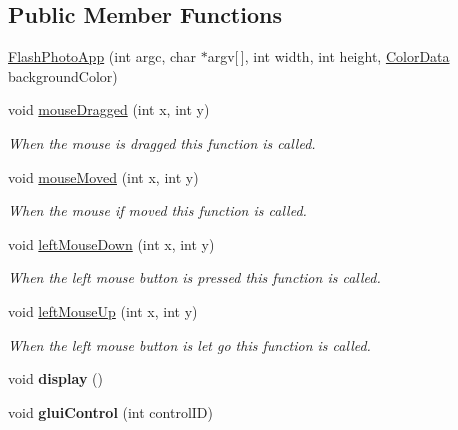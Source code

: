 \subsection*{Public Member Functions}
\begin{DoxyCompactItemize}
\item 
\hyperlink{classFlashPhotoApp_a944931218613603cfb6bda6113971382}{Flash\-Photo\-App} (int argc, char $\ast$argv\mbox{[}$\,$\mbox{]}, int width, int height, \hyperlink{classColorData}{Color\-Data} background\-Color)
\item 
\hypertarget{classFlashPhotoApp_a29505b498fac898e099cfd1b8590c91a}{void \hyperlink{classFlashPhotoApp_a29505b498fac898e099cfd1b8590c91a}{mouse\-Dragged} (int x, int y)}\label{classFlashPhotoApp_a29505b498fac898e099cfd1b8590c91a}

\begin{DoxyCompactList}\small\item\em When the mouse is dragged this function is called. \end{DoxyCompactList}\item 
\hypertarget{classFlashPhotoApp_acf5a4cc5b76bb676d337758543bfdcc4}{void \hyperlink{classFlashPhotoApp_acf5a4cc5b76bb676d337758543bfdcc4}{mouse\-Moved} (int x, int y)}\label{classFlashPhotoApp_acf5a4cc5b76bb676d337758543bfdcc4}

\begin{DoxyCompactList}\small\item\em When the mouse if moved this function is called. \end{DoxyCompactList}\item 
\hypertarget{classFlashPhotoApp_a2c348ddcc15b6a21972bc6aac98c5442}{void \hyperlink{classFlashPhotoApp_a2c348ddcc15b6a21972bc6aac98c5442}{left\-Mouse\-Down} (int x, int y)}\label{classFlashPhotoApp_a2c348ddcc15b6a21972bc6aac98c5442}

\begin{DoxyCompactList}\small\item\em When the left mouse button is pressed this function is called. \end{DoxyCompactList}\item 
\hypertarget{classFlashPhotoApp_ae3a2f37b7c3657dcb5c16402c6d25519}{void \hyperlink{classFlashPhotoApp_ae3a2f37b7c3657dcb5c16402c6d25519}{left\-Mouse\-Up} (int x, int y)}\label{classFlashPhotoApp_ae3a2f37b7c3657dcb5c16402c6d25519}

\begin{DoxyCompactList}\small\item\em When the left mouse button is let go this function is called. \end{DoxyCompactList}\item 
\hypertarget{classFlashPhotoApp_a5dedc84bbc9ea0cf0718b8d0d0f414a5}{void {\bfseries display} ()}\label{classFlashPhotoApp_a5dedc84bbc9ea0cf0718b8d0d0f414a5}

\item 
\hypertarget{classFlashPhotoApp_aaeea3b8490d0f0239e41b781f6a066aa}{void {\bfseries glui\-Control} (int control\-I\-D)}\label{classFlashPhotoApp_aaeea3b8490d0f0239e41b781f6a066aa}

\end{DoxyCompactItemize}
